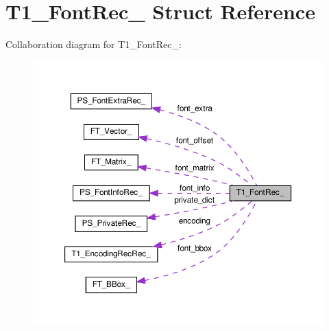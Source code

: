 \hypertarget{structT1__FontRec__}{}\section{T1\+\_\+\+Font\+Rec\+\_\+ Struct Reference}
\label{structT1__FontRec__}


Collaboration diagram for T1\+\_\+\+Font\+Rec\+\_\+\+:
\nopagebreak
\begin{figure}[H]
\begin{center}
\leavevmode
\includegraphics[width=350pt]{structT1__FontRec____coll__graph}
\end{center}
\end{figure}
